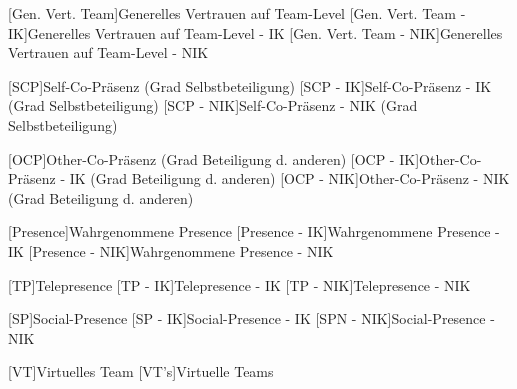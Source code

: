 \begin{acronym}
	[Gen. Vert. Team]{Generelles Vertrauen auf Team-Level}
	[Gen. Vert. Team - IK]{Generelles Vertrauen auf Team-Level - IK}
	[Gen. Vert. Team - NIK]{Generelles Vertrauen auf Team-Level - NIK}
	
	[SCP]{Self-Co-Präsenz (Grad Selbstbeteiligung)}
	[SCP - IK]{Self-Co-Präsenz - IK (Grad Selbstbeteiligung)}
	[SCP - NIK]{Self-Co-Präsenz - NIK (Grad Selbstbeteiligung)}	
	
	[OCP]{Other-Co-Präsenz (Grad Beteiligung d. anderen)}
	[OCP - IK]{Other-Co-Präsenz - IK (Grad Beteiligung d. anderen)}
	[OCP - NIK]{Other-Co-Präsenz - NIK (Grad Beteiligung d. anderen)}	
	
	[Presence]{Wahrgenommene Presence}
	[Presence - IK]{Wahrgenommene Presence - IK}
	[Presence - NIK]{Wahrgenommene Presence - NIK}
	
	[TP]{Telepresence}
	[TP - IK]{Telepresence - IK}
	[TP - NIK]{Telepresence - NIK}	
	
	[SP]{Social-Presence}
	[SP - IK]{Social-Presence - IK}
	[SPN - NIK]{Social-Presence - NIK}
	
	[VT]{Virtuelles Team}
	[VT's]{Virtuelle Teams}
\end{acronym}
